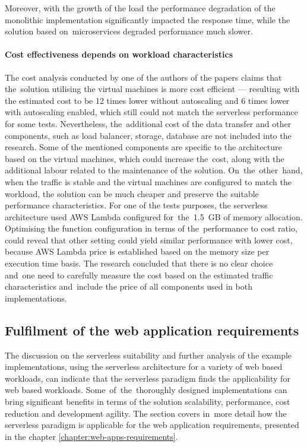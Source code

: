 Moreover, with the growth of the load the performance degradation of the monolithic implementation significantly impacted the response time, while the solution based on~microservices degraded performance much slower. \cite{ServerlessComputingAnInvestigationOfDeploymentEnvironmentsForWebAPIs}

\paragraph{Cost effectiveness depends on workload characteristics}

The cost analysis conducted by one of the authors of the papers \cite{ServerlessComputingAnInvestigationOfDeploymentEnvironmentsForWebAPIs} claims that the~solution utilising the virtual machines is more cost efficient --- resulting with the estimated cost to be 12 times lower without autoscaling and 6 times lower with autoscaling enabled, which still could not match the serverless performance for some tests.
Nevertheless, the~additional cost of the data transfer and other components, such as load balancer, storage, database are not included into the research.
Some of the mentioned components are specific to the architecture based on the virtual machines, which could increase the~cost, along with the additional labour related to the maintenance of the solution.
On~the~other~hand, when the traffic is stable and the virtual machines are configured to match the workload, the solution can be much cheaper and preserve the suitable performance characteristics.
For one of the tests purposes, the serverless architecture used AWS Lambda configured for~the~1.5~GB of memory allocation. Optimising the function configuration in terms of the~performance to cost ratio, could reveal that other setting could yield similar performance with lower cost, because AWS Lambda price is established based on the memory size per execution time basis.
The research concluded that there is no clear choice and~one need to carefully measure the cost based on the estimated traffic characteristics and~include the price of all components used in both implementations.

\subsection{Fulfilment of the web application requirements} \label{section:fulfilment-of-the-web-application-requirements}

The discussion on the serverless suitability and further analysis of the example implementations, using the serverless architecture for a variety of web based workloads, can indicate that the serverless paradigm finds the applicability for web based workloads.
Some~of~the~thoroughly designed implementations can bring significant benefits in terms of the solution scalability, performance, cost reduction and development agility.
The section covers in~more detail how the serverless paradigm is applicable for the web application requirements, presented in the chapter \ref{chapter:web-apps-requirements}.

